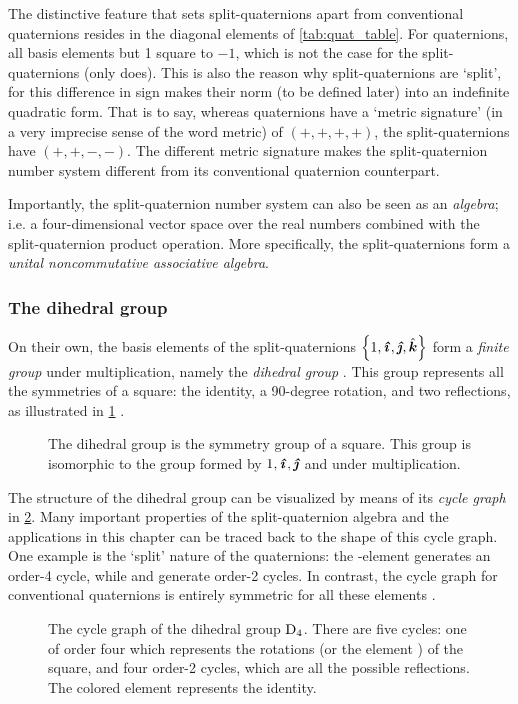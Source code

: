 The distinctive feature that sets split-quaternions apart from conventional quaternions resides in the diagonal elements of \cref{tab:quat_table}. For quaternions, all basis elements but 1 square to \(-1\), which is not the case for the split-quaternions (only \quati does). This is also the reason why split-quaternions are `split', for this difference in sign makes their norm (to be defined later) into an indefinite quadratic form. That is to say, whereas quaternions have a `metric signature' (in a very imprecise sense of the word metric) of \((+, +, +, +)\), the split-quaternions have \((+, +, -, -)\). The different metric signature makes the split-quaternion number system different from its conventional quaternion counterpart.

Importantly, the split-quaternion number system can also be seen as an \emph{algebra}; i.e. a four-dimensional vector space over the real numbers combined with the split-quaternion product operation. More specifically, the split-quaternions form a \emph{unital noncommutative associative algebra}.

\subsubsection{The dihedral group} 
On their own, the basis elements of the split-quaternions \(\qty{1, \quati, \quatj, \quatk}\) form a \emph{finite group} under multiplication, namely the \emph{dihedral group} . This group represents all the symmetries of a square: the identity, a 90-degree rotation, and two reflections, as illustrated in \cref{fig:square_symmetry} \cite{Dummit2004}.
\begin{figure}[ht!]
    \centering
    
    \caption{The dihedral group  is the symmetry group of a square. This group is isomorphic to the group formed by \(1, \quati, \quatj\) and \quatk under multiplication.}
    \label{fig:square_symmetry}
\end{figure}

The structure of the dihedral group can be visualized by means of its \emph{cycle graph} in \cref{fig:cycle_graph}. Many important properties of the split-quaternion algebra and the applications in this chapter can be traced back to the shape of this cycle graph. One example is the `split' nature of the quaternions: the \quati-element generates an order-4 cycle, while \quatj and \quatk generate order-2 cycles. In contrast, the cycle graph for conventional quaternions is entirely symmetric for all these elements \cite{Dummit2004}.
\begin{figure}[h!]
    \centering
    
    \caption{The cycle graph of the dihedral group $\mathrm{D}_4$. There are five cycles: one of order four which represents the rotations (or the element \quati) of the square, and four order-2 cycles, which are all the possible reflections. The colored element represents the identity.}
    \label{fig:cycle_graph}
\end{figure}

